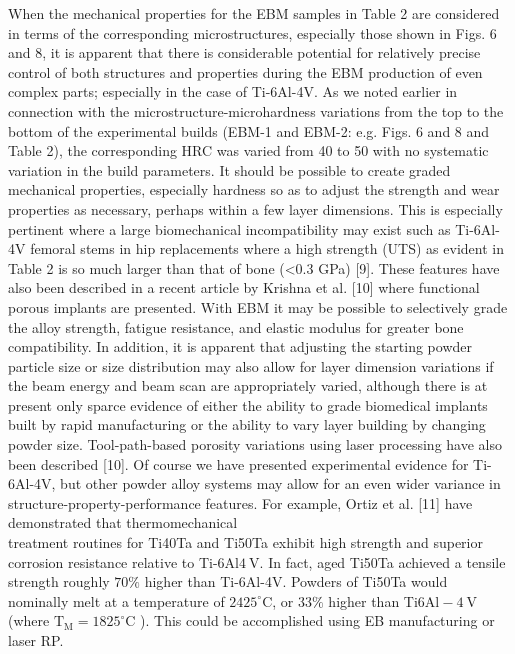 \documentclass[10pt]{article}
\begin{document}
When the mechanical properties for the EBM samples in Table 2 are considered in terms of the corresponding microstructures, especially those shown in Figs. 6 and 8, it is apparent that there is considerable potential for relatively precise control of both structures and properties during the EBM production of even complex parts; especially in the case of Ti-6Al-4V. As we noted earlier in connection with the microstructure-microhardness variations from the top to the bottom of the experimental builds (EBM-1 and EBM-2: e.g. Figs. 6 and 8 and Table 2), the corresponding HRC was varied from 40 to 50 with no systematic variation in the build parameters. It should be possible to create graded mechanical properties, especially hardness so as to adjust the strength and wear properties as necessary, perhaps within a few layer dimensions. This is especially pertinent where a large biomechanical incompatibility may exist such as Ti-6Al-4V femoral stems in hip replacements where a high strength (UTS) as evident in Table 2 is so much larger than that of bone (<0.3 GPa) [9]. These features have also been described in a recent article by Krishna et al. [10] where functional porous implants are presented. With EBM it may be possible to selectively grade the alloy strength, fatigue resistance, and elastic modulus for greater bone compatibility. In addition, it is apparent that adjusting the starting powder particle size or size distribution may also allow for layer dimension variations if the beam energy and beam scan are appropriately varied, although there is at present only sparce evidence of either the ability to grade biomedical implants built by rapid manufacturing or the ability to vary layer building by changing powder size. Tool-path-based porosity variations using laser processing have also been described [10]. Of course we have presented experimental evidence for Ti-6Al-4V, but other powder alloy systems may allow for an even wider variance in structure-property-performance features. For example, Ortiz et al. [11] have demonstrated that thermomechanical\\
treatment routines for Ti40Ta and Ti50Ta exhibit high strength and superior corrosion resistance relative to Ti-6Al$4 \mathrm{~V}$. In fact, aged Ti50Ta achieved a tensile strength roughly $70 \%$ higher than Ti-6Al-4V. Powders of Ti50Ta would nominally melt at a temperature of $2425^{\circ} \mathrm{C}$, or $33 \%$ higher than Ti$6 \mathrm{Al}-4 \mathrm{~V}$ (where $\mathrm{T}_{\mathrm{M}}=1825^{\circ} \mathrm{C}$ ). This could be accomplished using EB manufacturing or laser RP.
\end{document}
